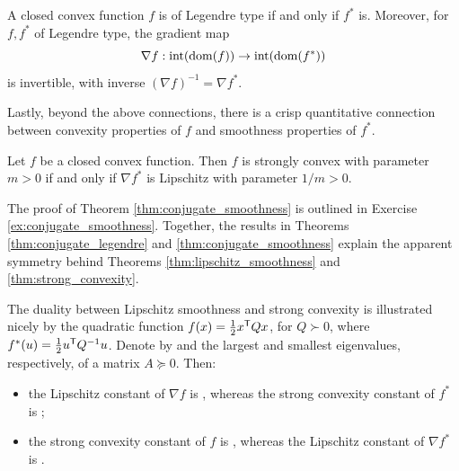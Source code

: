 \begin{Theorem}
\label{thm:conjugate_legendre}
A closed convex function $f$ is of Legendre type if and only if $f^*$
is. Moreover, for $f,f^*$ of Legendre type, the gradient map
\[
\nabla f : \operatorname{int}(\operatorname{dom}(f)) \to \operatorname{int}(\operatorname{dom}(f^*))
\]
is invertible, with inverse $(\nabla f)^{-1} = \nabla f^*$. 
\end{Theorem}


Lastly, beyond the above connections, there is a crisp quantitative connection
between convexity properties of $f$ and smoothness properties of $f^*$. 

\begin{Theorem}
\label{thm:conjugate_smoothness}
Let $f$ be a closed convex function. Then $f$ is strongly convex with parameter
$m>0$ if and only if $\nabla f^*$ is Lipschitz with parameter $1/m>0$. 
\end{Theorem}

The proof of Theorem \ref{thm:conjugate_smoothness} is outlined in Exercise
\ref{ex:conjugate_smoothness}. Together, the results in Theorems 
\ref{thm:conjugate_legendre} and \ref{thm:conjugate_smoothness} explain the
apparent symmetry behind Theorems \ref{thm:lipschitz_smoothness} and
\ref{thm:strong_convexity}.    

\medskip

\begin{Example}
The duality between Lipschitz smoothness and strong convexity is illustrated
nicely by the quadratic function $f(x) = \frac{1}{2} x^{\mathsf{T}} Q x$, for $Q \succ
0$, where $f^*(u) = \frac{1}{2} u^{\mathsf{T}} Q^{-1}u$. Denote by
 and  the largest and
smallest eigenvalues, respectively, of a matrix $A \succeq 0$. Then:
\begin{itemize}
\item the Lipschitz constant of $\nabla f$ is ,
  whereas the strong convexity constant of $f^*$ is
  ;
\item the strong convexity constant of $f$ is ,
  whereas the Lipschitz constant of $\nabla f^*$ is
  . 
\end{itemize}
\end{Example}

